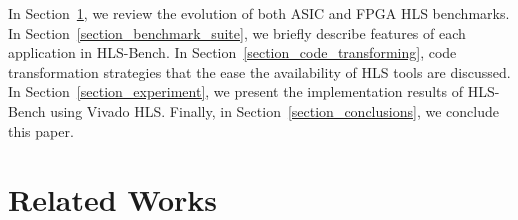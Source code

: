\documentclass[conference]{IEEEtran}
\begin{document}
In Section~\ref{section_related_work}, we review the evolution of both ASIC and FPGA HLS benchmarks. In Section~\ref{section_benchmark_suite}, we briefly describe features of each application in HLS-Bench. In Section~\ref{section_code_transforming}, code transformation strategies that the ease the availability of HLS tools are discussed. In Section~\ref{section_experiment}, we present the implementation results of HLS-Bench using Vivado HLS. Finally, in Section~\ref{section_conclusions}, we conclude this paper.

\section{Related Works}\label{section_related_work}



\end{document}
